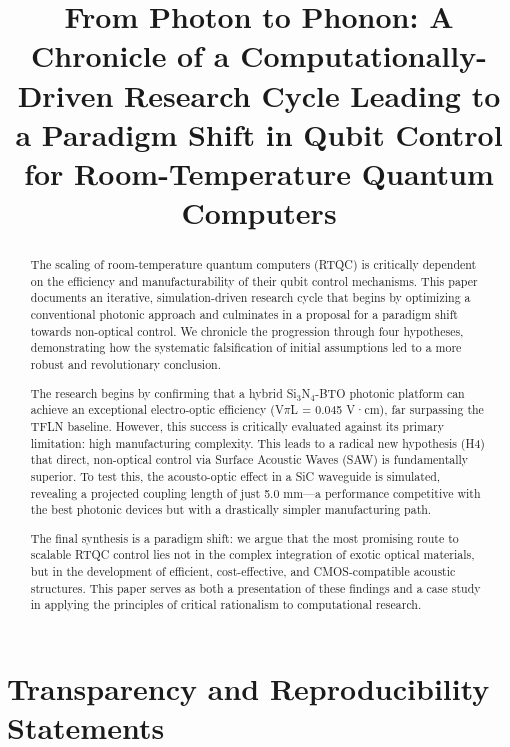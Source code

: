 \documentclass[conference]{IEEEtran} %
\title{From Photon to Phonon: A Chronicle of a Computationally-Driven Research Cycle Leading to a Paradigm Shift in Qubit Control for Room-Temperature Quantum Computers}
\author{
    \IEEEauthorblockN{Author Name(s)}
    \IEEEauthorblockA{
        \textit{Department Name} \\
        \textit{Institution Name}\\
        City, Country \\
        email address or ORCID
    }
}
\begin{document}

\maketitle

\begin{abstract}
The scaling of room-temperature quantum computers (RTQC) is critically dependent on the efficiency and manufacturability of their qubit control mechanisms. This paper documents an iterative, simulation-driven research cycle that begins by optimizing a conventional photonic approach and culminates in a proposal for a paradigm shift towards non-optical control. We chronicle the progression through four hypotheses, demonstrating how the systematic falsification of initial assumptions led to a more robust and revolutionary conclusion.

The research begins by confirming that a hybrid Si$_3$N$_4$-BTO photonic platform can achieve an exceptional electro-optic efficiency (V$\pi$L = 0.045 V·cm), far surpassing the TFLN baseline. However, this success is critically evaluated against its primary limitation: high manufacturing complexity. This leads to a radical new hypothesis (H4) that direct, non-optical control via Surface Acoustic Waves (SAW) is fundamentally superior. To test this, the acousto-optic effect in a SiC waveguide is simulated, revealing a projected coupling length of just 5.0 mm—a performance competitive with the best photonic devices but with a drastically simpler manufacturing path.

The final synthesis is a paradigm shift: we argue that the most promising route to scalable RTQC control lies not in the complex integration of exotic optical materials, but in the development of efficient, cost-effective, and CMOS-compatible acoustic structures. This paper serves as both a presentation of these findings and a case study in applying the principles of critical rationalism to computational research.
\end{abstract}

\section{Transparency and Reproducibility Statements}
\end{document}
